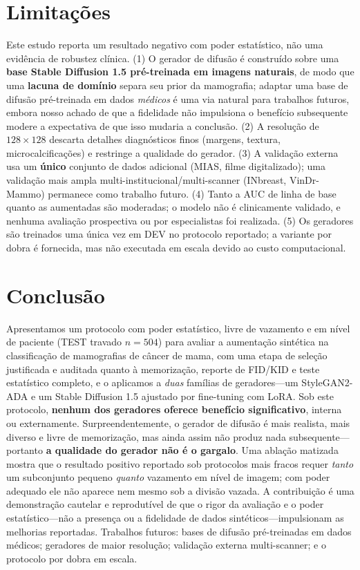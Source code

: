 \documentclass[runningheads]{llncs}
\begin{document}
\section{Limitações}
Este estudo reporta um resultado negativo com poder estatístico, não uma
evidência de robustez clínica. (1) O gerador de difusão é construído sobre uma
\textbf{base Stable Diffusion 1.5 pré-treinada em imagens naturais}, de modo que
uma \textbf{lacuna de domínio} separa seu prior da mamografia; adaptar uma base de
difusão pré-treinada em dados \emph{médicos} é uma via natural para trabalhos
futuros, embora nosso achado de que a fidelidade não impulsiona o benefício
subsequente modere a expectativa de que isso mudaria a conclusão. (2) A resolução
de $128\times128$ descarta detalhes diagnósticos finos (margens, textura,
microcalcificações) e restringe a qualidade do gerador. (3) A validação externa
usa um \textbf{único} conjunto de dados adicional (MIAS, filme digitalizado); uma
validação mais ampla multi-institucional/multi-scanner (INbreast, VinDr-Mammo)
permanece como trabalho futuro. (4) Tanto a AUC de linha de base quanto as
aumentadas são moderadas; o modelo não é clinicamente validado, e nenhuma
avaliação prospectiva ou por especialistas foi realizada. (5) Os geradores são
treinados uma única vez em DEV no protocolo reportado; a variante por dobra é
fornecida, mas não executada em escala devido ao custo computacional.

\section{Conclusão}
Apresentamos um protocolo com poder estatístico, livre de vazamento e em nível de
paciente (TEST travado $n{=}504$) para avaliar a aumentação sintética na
classificação de mamografias de câncer de mama, com uma etapa de seleção
justificada e auditada quanto à memorização, reporte de FID/KID e teste
estatístico completo, e o aplicamos a \emph{duas} famílias de geradores---um
StyleGAN2-ADA e um Stable Diffusion 1.5 ajustado por fine-tuning com LoRA. Sob
este protocolo, \textbf{nenhum dos geradores oferece benefício significativo},
interna ou externamente. Surpreendentemente, o gerador de difusão é mais realista,
mais diverso e livre de memorização, mas ainda assim não produz nada
subsequente---portanto \textbf{a qualidade do gerador não é o gargalo}. Uma
ablação matizada mostra que o resultado positivo reportado sob protocolos mais
fracos requer \emph{tanto} um subconjunto pequeno \emph{quanto} vazamento em nível
de imagem; com poder adequado ele não aparece nem mesmo sob a divisão vazada. A
contribuição é uma demonstração cautelar e reprodutível de que o rigor da
avaliação e o poder estatístico---não a presença ou a fidelidade de dados
sintéticos---impulsionam as melhorias reportadas. Trabalhos futuros: bases de
difusão pré-treinadas em dados médicos; geradores de maior resolução; validação
externa multi-scanner; e o protocolo por dobra em escala.
\end{document}
